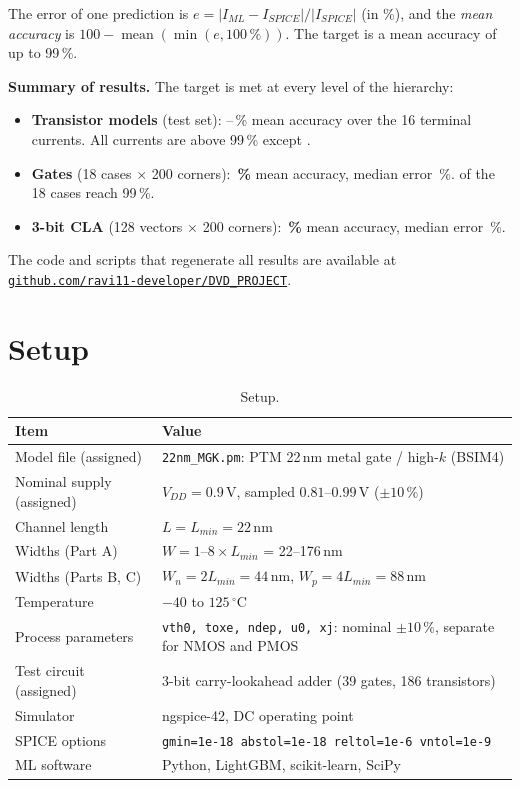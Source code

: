 \documentclass[12pt]{article}
\begin{document}
The error of one prediction is $e = |I_{ML}-I_{SPICE}|/|I_{SPICE}|$ (in \%), and the
\emph{mean accuracy} is $100 - \operatorname{mean}(\min(e, 100\,\%))$. The target is a mean
accuracy of up to 99\,\%.

\textbf{Summary of results.} The target is met at every level of the hierarchy:
\begin{itemize}
    \item \textbf{Transistor models} (test set): \ModelMinAcc--\ModelMaxAcc\,\% mean accuracy over
          the 16 terminal currents. All currents are above 99\,\% except \ModelMinAccWhere{}.
    \item \textbf{Gates} (18 cases $\times$ 200 corners): \textbf{\GateMeanAcc\,\%} mean accuracy,
          median error \GateMedErr\,\%. \GateNinetyNineCount{} of the 18 cases reach 99\,\%.
    \item \textbf{3-bit CLA} (128 vectors $\times$ 200 corners): \textbf{\ClaMeanAcc\,\%} mean
          accuracy, median error \ClaMedErr\,\%.
\end{itemize}
The code and scripts that regenerate all results are available at
\href{https://github.com/ravi11-developer/DVD_PROJECT.git}{\texttt{github.com/ravi11-developer/DVD\_PROJECT}}.

\section{Setup}
\begin{table}[H]
\centering
\begin{tabular}{ll}
\hline
Item & Value \\
\hline
Model file (assigned) & \texttt{22nm\_MGK.pm}: PTM 22\,nm metal gate / high-$k$ (BSIM4) \\
Nominal supply (assigned) & $V_{DD} = 0.9$\,V, sampled $0.81$--$0.99$\,V ($\pm10\,\%$) \\
Channel length & $L = L_{min} = 22$\,nm \\
Widths (Part A) & $W = 1$--$8\times L_{min}$ = 22--176\,nm \\
Widths (Parts B, C) & $W_n = 2L_{min} = 44$\,nm, $W_p = 4L_{min} = 88$\,nm \\
Temperature & $-40$ to $125\,^\circ$C \\
Process parameters & \texttt{vth0, toxe, ndep, u0, xj}: nominal $\pm10\,\%$, separate for NMOS and PMOS \\
Test circuit (assigned) & 3-bit carry-lookahead adder (39 gates, 186 transistors) \\
Simulator & ngspice-42, DC operating point \\
SPICE options & \texttt{gmin=1e-18 abstol=1e-18 reltol=1e-6 vntol=1e-9} \\
ML software & Python, LightGBM, scikit-learn, SciPy \\
\hline
\end{tabular}
\caption{Setup.}
\end{table}
\end{document}
